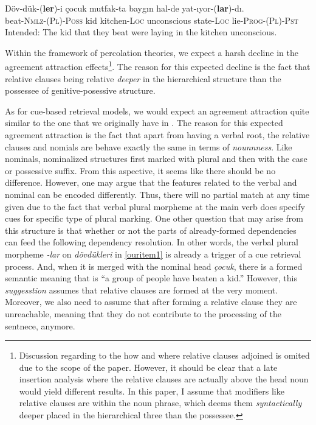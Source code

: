 \documentclass[doc]{apa6}
\let\rmarkdownfootnote\footnote%
\def\footnote{\protect\rmarkdownfootnote}
\begin{document}
\begin{exe}
  \ex \label{ouritem1}
      \gll D\"{o}v-d\"{u}k-(\textbf{ler})-i \c{c}ocuk mutfak-ta bayg{\i}n hal-de yat-{\i}yor-(\textbf{lar})-d{\i}.\\
  beat-\textsc{Nmlz}-(\textsc{Pl})-\textsc{Poss} kid kitchen-\textsc{Loc} unconscious state-\textsc{Loc} lie-\textsc{Prog}-(\textsc{Pl})-\textsc{Pst}\\
      \glt Intended: The kid that they beat were laying in the kitchen unconscious.
\end{exe}

Within the framework of percolation theories, we expect a harsh decline in the agreement attraction effects\footnote{Discussion regarding to the how and where relative clauses adjoined is omited due to the scope of the paper. However, it should be clear that a late insertion analysis where the relative clauses are actually above the head noun would yield different results. In this paper, I assume that modifiers like relative clauses are within the noun phrase, which deems them \textit{syntactically} deeper placed in the hierarchical three than the possessee.}. The reason for this expected decline is the fact that relative clauses being relative \emph{deeper} in the hierarchical structure than the possessee of genitive-posessive structure.

As for cue-based retrieval models, we would expect an agreement attraction quite similar to the one that we originally have in \textcite{Lago2018}. The reason for this expected agreement attraction is the fact that apart from having a verbal root, the relative clauses and nomials are behave exactly the same in terms of \emph{nounnness}. Like nominals, nominalized structures first marked with plural and then with the case or possessive suffix. From this aspective, it seems like there should be no difference. However, one may argue that the features related to the verbal and nominal can be encoded differently. Thus, there will no partial match at any time given due to the fact that verbal plural morpheme at the main verb does specify cues for specific type of plural marking. One other question that may arise from this structure is that whether or not the parts of already-formed dependencies can feed the following dependency resolution. In other words, the verbal plural morpheme \emph{-lar} on \emph{dövdükleri} in \autoref{ouritem1} is already a trigger of a cue retrieval process. And, when it is merged with the nominal head \emph{çocuk}, there is a formed semantic meaning that is \enquote{a group of people have beaten a kid.} However, this \emph{suggesstion} assumes that relative clauses are formed at the very moment. Moreover, we also need to assume that after forming a relative clause they are unreachable, meaning that they do not contribute to the processing of the sentnece, anymore.
\end{document}
